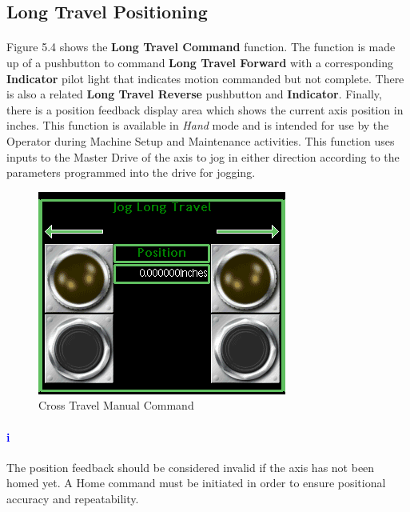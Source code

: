 \subsection{Long Travel Positioning}
\paragraph*{}Figure 5.4 shows the \textbf{Long Travel Command} function. The function is made up of a pushbutton to command \textbf{Long Travel Forward} with a corresponding \textbf{Indicator} pilot light that indicates motion commanded but not complete. There is also a related \textbf{Long Travel Reverse} pushbutton and \textbf{Indicator}. Finally, there is a position feedback display area which shows the current axis position in inches. This function is available in \textit{Hand} mode and is intended for use by the Operator during Machine Setup and Maintenance activities. This function uses inputs to the Master Drive of the axis to jog in either direction according to the parameters programmed into the drive for jogging.
\begin{figure}
	\centering
	\includegraphics[width=.2\linewidth]{screen-captures/manual/long-manual-command}
	\caption{Cross Travel Manual Command}
	\label{fig:long-manual-command}
\end{figure} 
\paragraph{\textbf{\LARGE \textcolor{blue}{i}}}The position feedback should be considered invalid if the axis has not been homed yet. A Home command must be initiated in order to ensure positional accuracy and repeatability.
